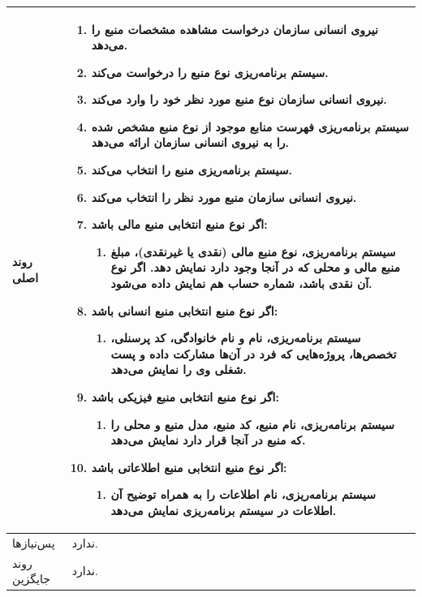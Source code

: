 \begin{table}[H]
\begin{tabular}{|p{3cm}|p{10cm}|}
		
		روند اصلی &
		\begin{enumerate}[topsep=0cm,leftmargin=0.5cm]
			\item نیروی انسانی سازمان  درخواست مشاهده مشخصات منبع را می‌دهد.
			\item سیستم برنامه‌ریزی نوع منبع را درخواست می‌کند.
			\item نیروی انسانی سازمان  نوع منبع مورد نظر خود را وارد می‌کند.
			\item سیستم برنامه‌ریزی فهرست منابع موجود از نوع منبع مشخص شده را به نیروی انسانی سازمان ارائه می‌دهد.
			\item سیستم برنامه‌ریزی منبع را انتخاب می‌کند.
			\item نیروی انسانی سازمان منبع مورد نظر را انتخاب می‌کند.
			\item اگر نوع منبع انتخابی منبع مالی باشد:
			\begin{enumerate}
				\item سیستم برنامه‌ریزی، نوع منبع مالی (نقدی یا غیرنقدی)، مبلغ منبع مالی و محلی که در آنجا وجود دارد نمایش دهد. اگر نوع آن نقدی باشد، شماره حساب هم نمایش داده می‌شود.
			\end{enumerate}
			\item اگر نوع منبع انتخابی منبع انسانی باشد:
			\begin{enumerate}
				\item سیستم برنامه‌ریزی، نام و نام خانوادگی، کد پرسنلی، تخصص‌ها، پروژه‌هایی که فرد در آن‌ها مشارکت داده و پست شغلی وی را نمایش می‌دهد.
			\end{enumerate}
			\item اگر نوع منبع انتخابی منبع فیزیکی باشد:
			\begin{enumerate}
				\item سیستم برنامه‌ریزی، نام منبع، کد منبع، مدل منبع و محلی را که منبع در آنجا قرار دارد نمایش می‌دهد.
			\end{enumerate}
			\item اگر نوع منبع انتخابی منبع اطلاعاتی باشد:
			\begin{enumerate}
				\item سیستم برنامه‌ریزی، نام اطلاعات را به همراه توضیح آن اطلاعات در سیستم برنامه‌ریزی نمایش می‌دهد.
			\end{enumerate}
		\end{enumerate} \\
		\hline
		
		پس‌نیازها & ندارد. \\
		
		\hline
		روند جایگزین
		& ندارد. \\
		\hline
		
	\end{tabular}
\end{table}



